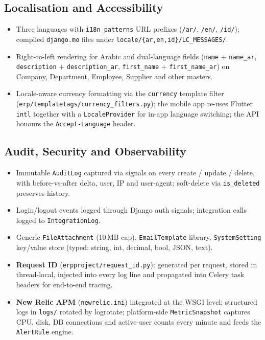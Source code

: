 \documentclass[12pt,a4paper]{report}
\begin{document}
\subsection{Localisation and Accessibility}
\begin{itemize}
  \item Three languages with \texttt{i18n\_patterns} URL prefixes (\texttt{/ar/}, \texttt{/en/}, \texttt{/id/}); compiled \texttt{django.mo} files under \texttt{locale/\{ar,en,id\}/LC\_MESSAGES/}.
  \item Right-to-left rendering for Arabic and dual-language fields (\texttt{name} + \texttt{name\_ar}, \texttt{description} + \texttt{description\_ar}, \texttt{first\_name} + \texttt{first\_name\_ar}) on Company, Department, Employee, Supplier and other masters.
  \item Locale-aware currency formatting via the \texttt{currency} template filter (\texttt{erp/templatetags/currency\_filters.py}); the mobile app re-uses Flutter \texttt{intl} together with a \texttt{LocaleProvider} for in-app language switching; the API honours the \texttt{Accept-Language} header.
\end{itemize}

\subsection{Audit, Security and Observability}
\begin{itemize}
  \item Immutable \texttt{AuditLog} captured via signals on every create / update / delete, with before-vs-after delta, user, IP and user-agent; soft-delete via \texttt{is\_deleted} preserves history.
  \item Login/logout events logged through Django auth signals; integration calls logged to \texttt{IntegrationLog}.
  \item Generic \texttt{FileAttachment} (10\,MB cap), \texttt{EmailTemplate} library, \texttt{SystemSetting} key/value store (typed: string, int, decimal, bool, JSON, text).
  \item \textbf{Request ID} (\texttt{erpproject/request\_id.py}): generated per request, stored in thread-local, injected into every log line and propagated into Celery task headers for end-to-end tracing.
  \item \textbf{New Relic APM} (\texttt{newrelic.ini}) integrated at the WSGI level; structured logs in \texttt{logs/} rotated by logrotate; platform-side \texttt{MetricSnapshot} captures CPU, disk, DB connections and active-user counts every minute and feeds the \texttt{AlertRule} engine.
\end{itemize}
\end{document}
